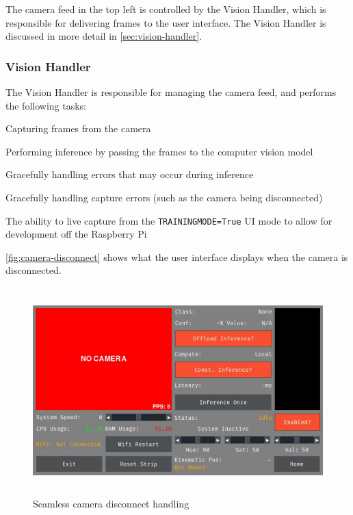 The camera feed in the top left is controlled by the Vision Handler, which is responsible for delivering frames to the user interface. The Vision Handler is discussed in more detail in \autoref{sec:vision-handler}. 

\subsubsection{Vision Handler}
\label{sec:vision-handler}
The Vision Handler is responsible for managing the camera feed, and performs the following tasks:
\begin{mylist}
    \item Capturing frames from the camera
    \item Performing inference by passing the frames to the computer vision model
    \item Gracefully handling errors that may occur during inference
    \item Gracefully handling capture errors (such as the camera being disconnected)
    \item The ability to live capture from the \texttt{TRAININGMODE=True} UI mode to allow for development off the Raspberry Pi
\end{mylist}

\autoref{fig:camera-disconnect} shows what the user interface displays when the camera is disconnected.

\begin{figure}[H]
    \hfill
    \begin{minipage}[t]{\textwidth}
      \centering
      \includegraphics[height=8cm]{imgs/software/screen.jpg}
      \caption{Seamless camera disconnect handling}
      \label{fig:camera-disconnect}
    \end{minipage}
\end{figure}

